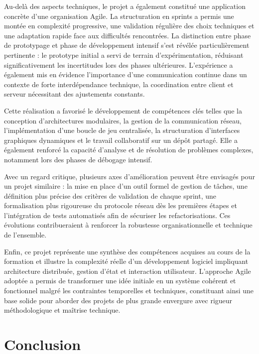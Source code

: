 \documentclass[a4paper, 11pt]{article}
\begin{document}
Au-delà des aspects techniques, le projet a également constitué une application concrète d’une organisation Agile. La structuration en sprints a permis une montée en complexité progressive, une validation régulière des choix techniques et une adaptation rapide face aux difficultés rencontrées. La distinction entre phase de prototypage et phase de développement intensif s’est révélée particulièrement pertinente : le prototype initial a servi de terrain d’expérimentation, réduisant significativement les incertitudes lors des phases ultérieures. L’expérience a également mis en évidence l’importance d’une communication continue dans un contexte de forte interdépendance technique, la coordination entre client et serveur nécessitant des ajustements constants.

Cette réalisation a favorisé le développement de compétences clés telles que la conception d’architectures modulaires, la gestion de la communication réseau, l’implémentation d’une boucle de jeu centralisée, la structuration d’interfaces graphiques dynamiques et le travail collaboratif sur un dépôt partagé. Elle a également renforcé la capacité d’analyse et de résolution de problèmes complexes, notamment lors des phases de débogage intensif.

Avec un regard critique, plusieurs axes d’amélioration peuvent être envisagés pour un projet similaire : la mise en place d’un outil formel de gestion de tâches, une définition plus précise des critères de validation de chaque sprint, une formalisation plus rigoureuse du protocole réseau dès les premières étapes et l’intégration de tests automatisés afin de sécuriser les refactorisations. Ces évolutions contribueraient à renforcer la robustesse organisationnelle et technique de l’ensemble.

Enfin, ce projet représente une synthèse des compétences acquises au cours de la formation et illustre la complexité réelle d’un développement logiciel impliquant architecture distribuée, gestion d’état et interaction utilisateur. L’approche Agile adoptée a permis de transformer une idée initiale en un système cohérent et fonctionnel malgré les contraintes temporelles et techniques, constituant ainsi une base solide pour aborder des projets de plus grande envergure avec rigueur méthodologique et maîtrise technique.

\section*{Conclusion}
\end{document}
